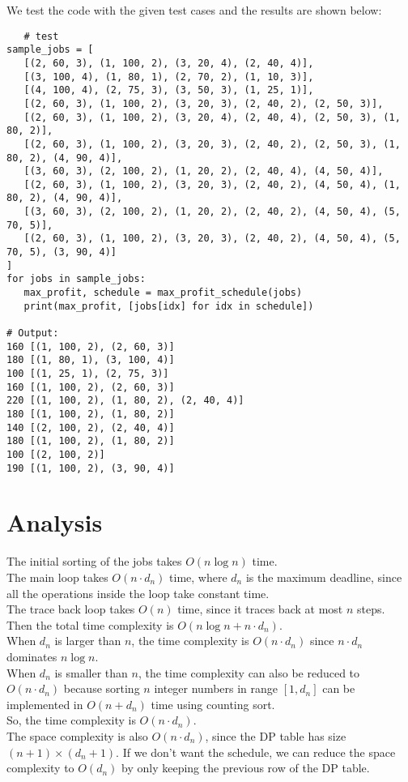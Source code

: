 \documentclass[UTF8]{ctexart}
\begin{document}
We test the code with the given test cases and the results are shown below:\\
\begin{lstlisting}
   # test
sample_jobs = [
   [(2, 60, 3), (1, 100, 2), (3, 20, 4), (2, 40, 4)],
   [(3, 100, 4), (1, 80, 1), (2, 70, 2), (1, 10, 3)],
   [(4, 100, 4), (2, 75, 3), (3, 50, 3), (1, 25, 1)],
   [(2, 60, 3), (1, 100, 2), (3, 20, 3), (2, 40, 2), (2, 50, 3)],
   [(2, 60, 3), (1, 100, 2), (3, 20, 4), (2, 40, 4), (2, 50, 3), (1, 80, 2)],
   [(2, 60, 3), (1, 100, 2), (3, 20, 3), (2, 40, 2), (2, 50, 3), (1, 80, 2), (4, 90, 4)],
   [(3, 60, 3), (2, 100, 2), (1, 20, 2), (2, 40, 4), (4, 50, 4)],
   [(2, 60, 3), (1, 100, 2), (3, 20, 3), (2, 40, 2), (4, 50, 4), (1, 80, 2), (4, 90, 4)],
   [(3, 60, 3), (2, 100, 2), (1, 20, 2), (2, 40, 2), (4, 50, 4), (5, 70, 5)],
   [(2, 60, 3), (1, 100, 2), (3, 20, 3), (2, 40, 2), (4, 50, 4), (5, 70, 5), (3, 90, 4)]
]
for jobs in sample_jobs:
   max_profit, schedule = max_profit_schedule(jobs)
   print(max_profit, [jobs[idx] for idx in schedule])

# Output:
160 [(1, 100, 2), (2, 60, 3)]
180 [(1, 80, 1), (3, 100, 4)]
100 [(1, 25, 1), (2, 75, 3)]
160 [(1, 100, 2), (2, 60, 3)]
220 [(1, 100, 2), (1, 80, 2), (2, 40, 4)]
180 [(1, 100, 2), (1, 80, 2)]
140 [(2, 100, 2), (2, 40, 4)]
180 [(1, 100, 2), (1, 80, 2)]
100 [(2, 100, 2)]
190 [(1, 100, 2), (3, 90, 4)]
\end{lstlisting}

\section{Analysis}
The initial sorting of the jobs takes $O(n\log n)$ time.\\
The main loop takes $O(n \cdot d_n)$ time, where $d_n$ is the maximum deadline,
since all the operations inside the loop take constant time.\\
The trace back loop takes $O(n)$ time, since it traces back at most $n$ steps.\\
Then the total time complexity is $O(n\log n + n \cdot d_n)$.\\
When $d_n$ is larger than $n$, the time complexity is $O(n \cdot d_n)$ since $n \cdot d_n$ dominates $n\log n$.\\
When $d_n$ is smaller than $n$, the time complexity can also be reduced to $O(n \cdot d_n)$ because sorting $n$ integer numbers in range $[1,d_n]$
can be implemented in $O(n+d_n)$ time using counting sort.\\
So, the time complexity is $O(n \cdot d_n)$.\\

The space complexity is also $O(n \cdot d_n)$, since the DP table has size $(n+1) \times (d_n+1)$. If we don't
want the schedule, we can reduce the space complexity to $O(d_n)$ by only keeping the previous row of the DP table.\\
\end{document}
